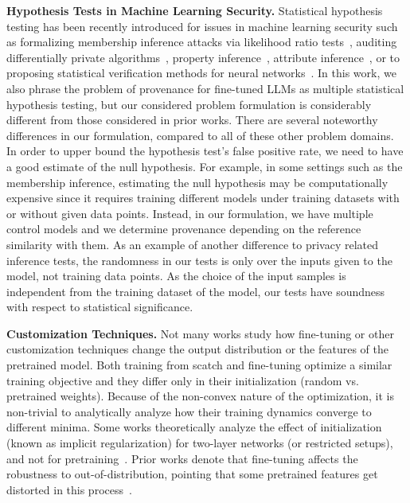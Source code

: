 \vspace{10pt}
\noindent
\textbf{Hypothesis Tests in Machine Learning Security.}
Statistical hypothesis testing has been recently introduced for issues in machine learning security such as formalizing membership inference attacks via likelihood ratio tests~\cite{carlini2022membership,salem2023sok}, auditing differentially private algorithms~\cite{nasr2023tight,jagielski2020auditing}, property inference~\cite{mahloujifar2022property}, attribute inference~\cite{zhang2021leakage,fredrikson2015model}, or to proposing statistical verification methods for neural networks~\cite{baluta2021scalable}.
In this work, we also phrase the problem of provenance for fine-tuned LLMs as multiple statistical hypothesis testing, but our considered problem formulation is considerably different from those considered in prior works.
%
There are several noteworthy differences in our formulation, compared to all of these other problem domains. In order to upper bound the hypothesis test's false positive rate, we need to have a good estimate of the null hypothesis. For example, in some settings such as the membership inference, estimating the null hypothesis may be computationally expensive since it requires training different models under training datasets with or without given data points. Instead, in our formulation, we have multiple control models and we determine provenance depending on the reference similarity with them.
%
As an example of another difference to privacy related inference tests, the randomness in our tests is only over the inputs given to the model, not training data points. As the choice of the input samples is independent from the training dataset of the model, our tests have soundness with respect to statistical significance. 


%
%
%
%
%
%
%
%
%
%
%
%

\vspace{10pt}
\noindent
\textbf{Customization Techniques.}
Not many works study how fine-tuning or other customization techniques change the output distribution or the features of the pretrained model.
Both training from scatch and fine-tuning optimize a similar training objective and they differ only in their initialization (random vs. pretrained weights).
Because of the non-convex nature of the optimization, it is non-trivial to analytically analyze how their training dynamics converge to different minima. Some works theoretically analyze the effect of initialization (known as implicit regularization) for two-layer networks (or restricted setups), and not for pretraining~\cite{neyshabur2015norm,saxe2014exact,soudry2018implicit}. 
Prior works denote that fine-tuning affects the robustness to out-of-distribution, pointing that some pretrained features get distorted in this process~\cite{kumarfine,radford2021learning,shuttleworth2024lora}.